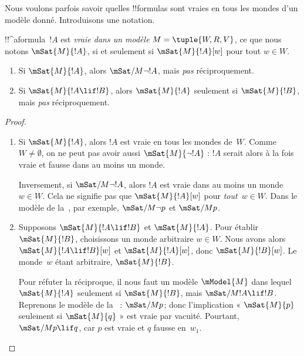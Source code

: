 \documentclass[../../../include/open-logic-section]{subfiles}
\begin{document}


Nous voulons parfois savoir quelles !!{formula}s sont vraies en
tous les mondes d'un modèle donné. Introduisons une notation.

\begin{defn}
  !!^a{formula}~$!A$ est \emph{vraie dans un modèle}
  $M = \tuple{W, R, V}$, ce que nous notons $\mSat{M}{!A}$,
  si et seulement si $\mSat{M}{!A}[w]$ pour tout $w \in W$.
\end{defn}

\begin{prop}
  \begin{enumerate}
  \item Si $\mSat{M}{!A}$, alors $\mSat/{M}{\lnot !A}$, mais
    \emph{pas} réciproquement.
  \item Si $\mSat{M}{!A \lif !B}$, alors
    $\mSat{M}{!A}$ seulement si $\mSat{M}{!B}$, mais
    \emph{pas} réciproquement.
  \end{enumerate}
\end{prop}

\begin{proof}
  \begin{enumerate}
  \item Si $\mSat{M}{!A}$, alors $!A$ est vraie en tous les mondes
    de~$W$. Comme $W \neq \emptyset$, on ne peut pas avoir aussi
    $\mSat{M}{\lnot!A}$ : $!A$ serait alors à la fois vraie
    et fausse dans au moins un monde.

    Inversement, si $\mSat/{M}{\lnot !A}$, alors $!A$ est vraie
    dans au moins un monde~$w \in W$. Cela ne signifie pas que
    $\mSat{M}{!A}[w]$ pour \emph{tout}~$w \in W$. Dans le modèle
    de la~, par exemple,
    $\mSat/{M}{\lnot p}$ et $\mSat/{M}{p}$.
  \item Supposons $\mSat{M}{!A \lif !B}$ et $\mSat{M}{!A}$.
    Pour établir $\mSat{M}{!B}$, choisissons un monde arbitraire
    $w \in W$. Nous avons alors
    $\mSat{M}{!A \lif !B}[w]$ et $\mSat{M}{!A}[w]$, donc
    $\mSat{M}{!B}[w]$. Le monde~$w$ étant arbitraire,
    $\mSat{M}{!B}$.

    Pour réfuter la réciproque, il nous faut un modèle
    $\mModel{M}$ dans lequel $\mSat{M}{!A}$ seulement si
    $\mSat{M}{!B}$, mais $\mSat/{M}{!A \lif !B}$.
    Reprenons le modèle de la~ :
    $\mSat/{M}{p}$; donc l'implication « $\mSat{M}{p}$ seulement
    si $\mSat{M}{q}$ » est vraie par vacuité. Pourtant,
    $\mSat/{M}{p \lif q}$, car $p$ est vraie et $q$ fausse
    en~$w_1$.
  \end{enumerate}
\end{proof}
\end{document}
